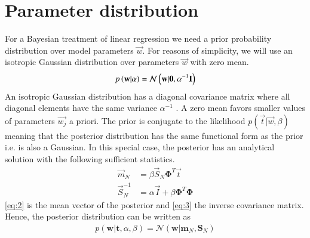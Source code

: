 \documentclass[journal,12pt,twocolumn]{IEEEtran}
\begin{document}
\section{Parameter distribution}
For a Bayesian treatment of linear regression we need a prior probability distribution over model parameters $\vec{w}$. For reasons of simplicity, we will use an isotropic Gaussian distribution over parameters $\vec{w}$ with zero mean.
%
\begin{align}
p\left(\mathbf{w}\lvert \alpha\right) = \mathcal{N}\left(\mathbf{w} \lvert \mathbf{0}, \alpha^{-1}\mathbf{I}\right)
\end{align}
%
An isotropic Gaussian distribution has a diagonal covariance matrix where all diagonal elements have the same variance $\alpha^{-1}$ . A zero mean favors smaller values of parameters $\vec{w_j}$ a priori. The prior is conjugate to the likelihood $p(\vec{t} \lvert \vec{w}, \beta)$ meaning that the posterior distribution has the same functional form as the prior i.e. is also a Gaussian. In this special case, the posterior has an analytical solution with the following sufficient statistics.
\begin{align}
\vec{m}_N &= \beta \vec{S}_N \boldsymbol\Phi^T \vec{t} \label{eq:2}\\
\vec{S}_N^{-1} &= \alpha\vec{I} + \beta \boldsymbol\Phi^T \boldsymbol\Phi \label{eq:3}
\end{align}
\eqref{eq:2} is the mean vector of the posterior and \eqref{eq:3} the inverse covariance matrix. Hence, the posterior distribution can be written as
\begin{align}
    p(\mathbf{w} \lvert \mathbf{t}, \alpha, \beta) = \mathcal{N}(\mathbf{w} \lvert \mathbf{m}_N, \mathbf{S}_N) \label{eq:5}
\end{align}
\end{document}
